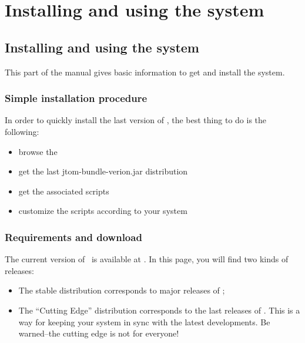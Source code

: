 \part{Installing and using the system}
\chapter{Installing and using the system}
This part of the manual gives basic information to get and install the
system.

\section{Simple installation procedure}
In order to quickly install the last version of \TOM, the best thing
to do is the following:
{\bf
\begin{itemize}
\item browse the 
\item get the last jtom-bundle-verion.jar distribution
\item get the associated scripts
\item customize the scripts according to your system
\end{itemize}
}

\section{Requirements and download}
The current version of \TOM\ is available at .
In this page, you will find two kinds of releases:

\begin{itemize}
\item The stable distribution corresponds to major releases of \TOM;
\item The ``Cutting Edge'' distribution corresponds to the last
  releases of \TOM. This is a way for keeping your system in sync with
  the latest developments. Be warned--the cutting edge is not for
  everyone! 
\end{itemize}

